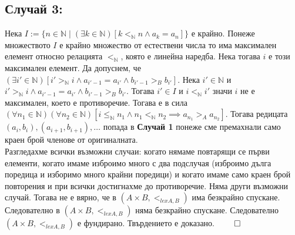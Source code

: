 \documentclass[a4paper, 12pt, oneside]{article}
\begin{document}
\subsection*{Случай 3:}
Нека \(I := \{n \in \mathbb{N} \; | \; (\exists k \in \mathbb{N})[k <_{\mathbb{N}} n \land a_k = a_n]\}\) е крайно.
Понеже множеството \(I\) е крайно множество от естествени числа то има максимален елемент относно релацията \(<_{\mathbb{N}}\), която е линейна наредба.
Нека тогава \(i\) е този максимален елемент.
Да допуснем, че \((\exists i' \in \mathbb{N})[i' >_{\mathbb{N}} i \land a_{i' - 1} = a_{i'} \land b_{i' - 1} >_B b_{i'}]\).
Нека \(i' \in \mathbb{N}\) и \(i' >_{\mathbb{N}} i \land a_{i' - 1} = a_{i'} \land b_{i' - 1} >_B b_{i'}\).
Тогава \(i' \in I\) и \(i <_{\mathbb{N}} i'\) значи \(i\) не е максимален, което е противоречие. Тогава е в сила 
\((\forall n_1 \in \mathbb{N})(\forall n_2 \in \mathbb{N})[i \leq_{\mathbb{N}} n_1 \land n_1 <_{\mathbb{N}} n_2 \implies a_{n_1} >_A a_{n_2}]\).
Тогава редицата \((a_i, b_i), (a_{i + 1}, b_{i + 1}), \dots\) попада в \textbf{Случай 1} понеже сме премахнали само краен брой членове от оригиналната. \\
Разгледахме всички възможни случаи: когато нямаме повтарящи се първи елементи,
когато имаме изброимо много с два подслучая (изброимо дълга поредица и изборимо много крайни поредици)
и когато имаме само краен брой повторения и при всички достигнахме до противоречие. Няма други възможни случай.
Тогава не е вярно, че в \((A \times B, <_{lex A, B})\) има безкрайно спускане. 
Следователно в \((A \times B, <_{lex A, B})\) няма безкрайно спускане.
Следователно \((A \times B, <_{lex A, B})\) е фундирано.
Твърдението е доказано. \(\qed\)
\end{document}
